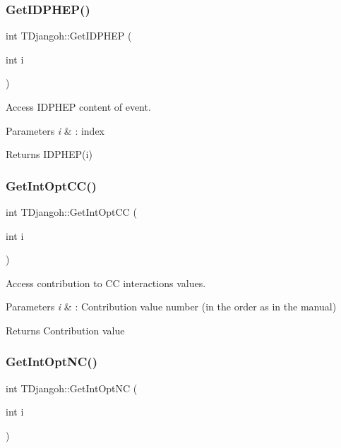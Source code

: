 \subsubsection{\texorpdfstring{Get\+I\+D\+P\+H\+E\+P()}{GetIDPHEP()}}
{\footnotesize\ttfamily int T\+Djangoh\+::\+Get\+I\+D\+P\+H\+EP (\begin{DoxyParamCaption}\item[{int}]{i }\end{DoxyParamCaption})}



Access I\+D\+P\+H\+EP content of event. 


\begin{DoxyParams}{Parameters}
{\em i} & \+: index \\
\hline
\end{DoxyParams}
\begin{DoxyReturn}{Returns}
I\+D\+P\+H\+E\+P(i) 
\end{DoxyReturn}
\mbox{\label{class_t_djangoh_a39b356c5689222e6c82172e9b4954fe1}} 
\subsubsection{\texorpdfstring{Get\+Int\+Opt\+C\+C()}{GetIntOptCC()}}
{\footnotesize\ttfamily int T\+Djangoh\+::\+Get\+Int\+Opt\+CC (\begin{DoxyParamCaption}\item[{int}]{i }\end{DoxyParamCaption})}



Access contribution to CC interactions values. 


\begin{DoxyParams}{Parameters}
{\em i} & \+: Contribution value number (in the order as in the manual) \\
\hline
\end{DoxyParams}
\begin{DoxyReturn}{Returns}
Contribution value 
\end{DoxyReturn}
\mbox{\label{class_t_djangoh_aea74b082287a6870a27b07217832768f}} 
\subsubsection{\texorpdfstring{Get\+Int\+Opt\+N\+C()}{GetIntOptNC()}}
{\footnotesize\ttfamily int T\+Djangoh\+::\+Get\+Int\+Opt\+NC (\begin{DoxyParamCaption}\item[{int}]{i }\end{DoxyParamCaption})}



